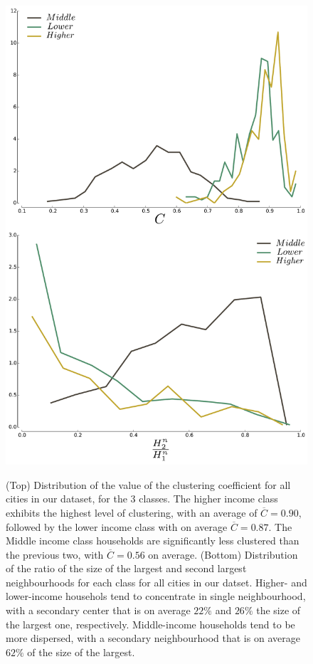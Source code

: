 \begin{figure} 
    \includegraphics[width=\textwidth]{gfx/chapter-segregation/figure6.pdf}\\
    \caption{(Top) Distribution of the value of the clustering coefficient for
        all cities in our dataset, for the 3 classes. The higher income class
        exhibits the highest level of clustering, with an average of
        $\overline{C} = 0.90$, followed by the lower income class with on
        average $\overline{C} = 0.87$. The Middle income class households are
        significantly less clustered than the previous two, with $\overline{C} =
        0.56$ on average.  (Bottom) Distribution of the ratio of the size of the
        largest and second largest neighbourhoods for each class for all cities in our
        datset. Higher- and lower-income househols tend to concentrate in single
        neighbourhood, with a secondary center that is on average $22\%$ and
        $26\%$ the size of the largest one, respectively. Middle-income
        households tend to be more dispersed, with a secondary neighbourhood that is on
        average $62\%$ of the size of the largest.} \label{fig:clustering} 
\end{figure}


